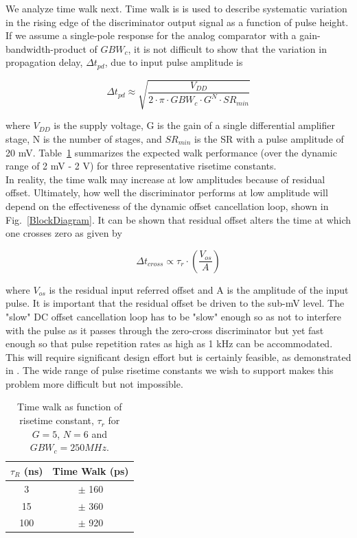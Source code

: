 \documentclass[12pt, onecolumn]{IEEEtran}
\begin{document}
\noindent
We analyze time walk next.  Time walk is is used to describe systematic variation in the rising edge of the discriminator output signal as a function of pulse height.  If we assume a single-pole response for the analog comparator with a gain-bandwidth-product of $GBW_c$, it is not difficult to show that the variation in propagation delay, $\Delta t_{pd}$, due to input pulse amplitude is 

\begin{equation*}
\Delta t_{pd} \approx  \sqrt{\frac{V_{DD}}{2 \cdot \pi \cdot GBW_c \cdot G^N \cdot SR_{min}}}
\end{equation*}

\noindent
\newline
where $V_{DD}$ is the supply voltage, G is the gain of a single differential amplifier stage, N is the number of stages, and $SR_{min}$ is  the SR with a pulse amplitude of 20 mV.   Table~\ref{WalkTable} summarizes the expected walk performance (over the dynamic range of 2 mV - 2 V) for three representative risetime constants.\\

\noindent
In reality, the time walk may increase at low amplitudes because of residual offset.  Ultimately, how well the discriminator performs at low amplitude will depend on the effectiveness of the dynamic offset cancellation loop, shown in Fig.~\ref{BlockDiagram}.  It can be shown that residual offset alters the time at which one crosses zero as given by

\begin{equation*}
\Delta t_{cross} \propto  \tau_r \cdot (\frac{V_{os}}{A})
\end{equation*}

\noindent
where $V_{os}$ is the residual input referred offset and A is the amplitude of the input pulse. It is important that the residual offset be driven to the sub-mV level.  The "slow" DC offset cancellation loop has to be "slow" enough so as not to interfere with the pulse as it passes through the zero-cross discriminator but yet fast enough so that pulse repetition rates as high as 1 kHz can be accommodated.  This will require significant design effort but is certainly feasible, as demonstrated in \cite{507173}. The wide range of pulse risetime constants we wish to support makes this problem more difficult but not impossible.

\begin{table}[htbp!]
\begin{center}
\begin{tabular}{||c | c||} 
\hline
$\tau_R$ (ns) & Time Walk  (ps)\\ [0.5ex] 
\hline\hline
3 & $\pm$ 160 \\ 
\hline
15 & $\pm$ 360  \\
\hline
100 &  $\pm$ 920 \\ [1ex] 
\hline
\end{tabular}
\end{center}
\caption{Time walk as function of risetime constant, $\tau_r$ for $G = 5$, $N = 6$ and $GBW_{c} = 250 MHz$.}
\label{WalkTable}
\end{table}
\end{document}
